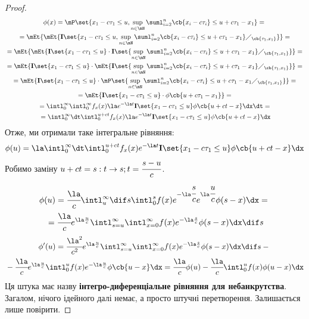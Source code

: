 \begin{proof}
\begin{multline}
	\phi(x) = \mP\set{x_1 - c\tau_1\leq u, \sup\limits_{n\in \mN} \suml_{i=2}^n \cb{x_i-c\tau_i}\leq u +c\tau_1 - x_1}  = {}\\{}= \mEt{\mEt{\mathbf{I}\set{x_1 - c\tau_1\leq u, \sup\limits_{n\in \mN} \suml_{i=2}^n \cb{x_i-c\tau_i}\leq u +c\tau_1 - x_1}\diagup_{\cb{\tau_1,x_1}}}} = {} \\ {} = \mEt{   \mEt{\mathbf{I}\set{x_1-c\tau_1\leq u}\cdot\mathbf{I}\set{\sup\limits_{n\in \mN} \suml_{i=2}^n \cb{x_i-c\tau_i}\leq u +c\tau_1 - x_1}\diagup_{\cb{\tau_1,x_1}}}  } = {} \\ {} = \mEt{\mathbf{I}\set{x_1-c\tau_1\leq u}\cdot \mEt{\mathbf{I}\set{\sup\limits_{n\in \mN} \suml_{i=2}^n \cb{x_i-c\tau_i}\leq u +c\tau_1 - x_1}\diagup_{\cb{\tau_1,x_1}}}} = {} \\ {} = \mEt{\mathbf{I}\set{x_1-c\tau_1\leq u}\cdot \mP\set{\sup\limits_{n\in \mN} \suml_{i=2}^n \cb{x_i-c\tau_i}\leq u +c\tau_1 - x_1\diagup_{\cb{\tau_1,x_1}}}} = {} \\ {} = \mEt{\mathbf{I}\set{x_1-c\tau_1\leq u}\cdot \phi\cb{u+c\tau_1-x_1}} = {} \\ {} = \intl_0^\infty \intl_0^\infty f_x(x) \la e^{-\la t} \mathbf{I}\set{x_1-c\tau_1\leq u} \phi\cb{u+ct-x}\dx\dt = {}\\ {} =\intl_0^\infty \dt \intl_0^{u+ct} f_x(x) \la e^{-\la t} \mathbf{I}\set{x_1-c\tau_1\leq u} \phi\cb{u+ct-x}\dx
\end{multline}
Отже, ми отримали таке інтегральне рівняння:
\begin{equation}
	\phi(u) =  \la \intl_0^\infty \dt \intl_0^{u+ct} f_x(x)e^{-\la t} \mathbf{I}\set{x_1-c\tau_1\leq u} \phi\cb{u+ct-x}\dx
\end{equation}
Робимо заміну $u+ct=s:t\to s;t=\cfrac{s-u}c$.
\begin{multline}
	\phi(u) = \cfrac\la c \intl_u^\infty \dif s \intl_0^s f(x) e^{-\la\cfrac sc} e^{\la \cfrac uc} \phi(s-x)\dx = {} \\{} = \cfrac\la c e^{\la \frac uc} \intl_{s=u}^\infty \intl_{x=0}^\infty f(x) e^{-\la \frac sc} \phi(s-x) \dx\dif s
\end{multline}
\begin{multline}
	\phi'(u) = \cfrac{\la^2}{c^2} e^{\la\frac uc} \intl_{s=u}^\infty \intl_{x=0}^\infty f(x) e^{-\la \frac sc} \phi(s-x) \dx\dif s -{}\\{} - \cfrac\la c e^{\la\frac uc} \intl_0^u f(x) e^{-\la \frac uc} \phi\cb{u-x} \dx = \cfrac\la c \phi(u) - \cfrac\la c \intl_0^u f(x) \phi(u-x) \dx
\end{multline}
Ця штука має назву \textbf{інтегро-диференціальне рівняння для небанкрутства}. Загалом, нічого ідейного далі немає, а просто штучні перетворення. Залишається лише повірити.
\end{proof}